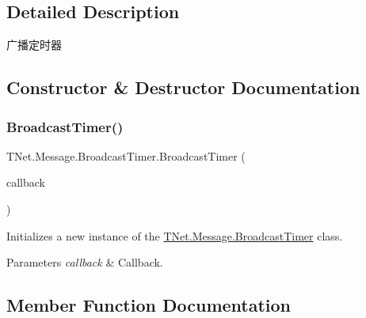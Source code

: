 \subsection{Detailed Description}
广播定时器 



\subsection{Constructor \& Destructor Documentation}
\mbox{\label{class_t_net_1_1_message_1_1_broadcast_timer_abcf0ff0d54000d1286590c1aed0efe15}} 
\subsubsection{\texorpdfstring{Broadcast\+Timer()}{BroadcastTimer()}}
{\footnotesize\ttfamily T\+Net.\+Message.\+Broadcast\+Timer.\+Broadcast\+Timer (\begin{DoxyParamCaption}\item[{\mbox{\hyperlink{class_t_net_1_1_message_1_1_broadcast_timer_a1448fe69d16ce4a9e2b202e1d82fd944}{Broadcast\+Callback}}}]{callback }\end{DoxyParamCaption})}



Initializes a new instance of the \mbox{\hyperlink{class_t_net_1_1_message_1_1_broadcast_timer}{T\+Net.\+Message.\+Broadcast\+Timer}} class. 


\begin{DoxyParams}{Parameters}
{\em callback} & Callback.\\
\hline
\end{DoxyParams}


\subsection{Member Function Documentation}
\mbox{\label{class_t_net_1_1_message_1_1_broadcast_timer_a6903709845c4dc7a6d5b8c325f50e993}} 
